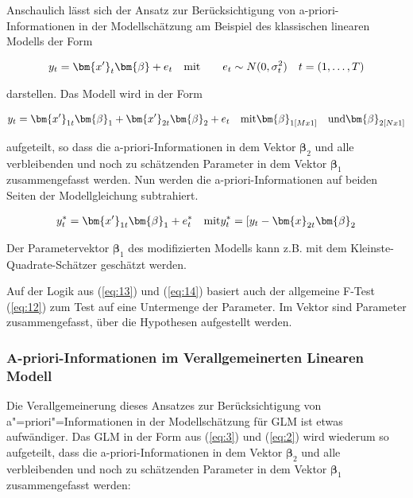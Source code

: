 Anschaulich lässt sich der Ansatz zur Berücksichtigung von a-priori-Informationen in der Modellschätzung am Beispiel des klassischen linearen Modells der Form

\begin{eqnarray} 
y_t=\bm{x'}_t \bm{\beta} + e_t                   \quad  \textnormal{mit}  \qquad    e_t \sim N(0,\sigma_t^2) \quad t=(1,\ldots,T)
\end{eqnarray}

darstellen. Das Modell wird in der Form

\begin{eqnarray} \label{eq:13}
y_t=\bm{x'}_{1t} \bm{\beta}_1  +   \bm{x'}_{2t} \bm{\beta}_2   + e_t     \quad  \textnormal{mit}    \bm{\beta}_{1[Mx1]} \quad  \textnormal{und}    \bm{\beta}_{2[Nx1]}
\end{eqnarray}

aufgeteilt, so dass die a-priori-Informationen in dem Vektor $\bm{\beta}_2$ und alle verbleibenden und noch zu schätzenden Parameter in dem Vektor  $\bm{\beta}_1$ zusammengefasst werden. Nun werden die a-priori-Informationen auf beiden Seiten der Modellgleichung subtrahiert.

\begin{eqnarray} \label{eq:14}
y^*_t=\bm{x'}_{1t} \bm{\beta}_1     + e^*_t     \quad  \textnormal{mit}     y^*_t = [y_t - \bm{x}_{2t} \bm{\beta}_2
\end{eqnarray}

Der Parametervektor $\bm{\beta}_1$  des modifizierten Modells kann z.B. mit dem Kleinste-Quadrate-Schätzer geschätzt werden. 
 
Auf der Logik aus (\ref{eq:13}) und (\ref{eq:14}) basiert auch der allgemeine F-Test (\ref{eq:12}) zum Test auf eine Untermenge der Parameter. Im Vektor   sind Parameter zusammengefasst, über die Hypothesen aufgestellt werden.


\subsubsection{A-priori-Informationen im Verallgemeinerten Linearen Modell}

Die Verallgemeinerung dieses Ansatzes zur Berücksichtigung von a"=priori"=Informationen in der Modellschätzung für GLM ist etwas aufwändiger. Das GLM in der Form aus (\ref{eq:3}) und (\ref{eq:2}) wird wiederum so aufgeteilt, dass die a-priori-Informationen in dem Vektor $\bm{\beta}_2$ und alle verbleibenden und noch zu schätzenden Parameter in dem Vektor $\bm{\beta}_1$  zusammengefasst werden:

